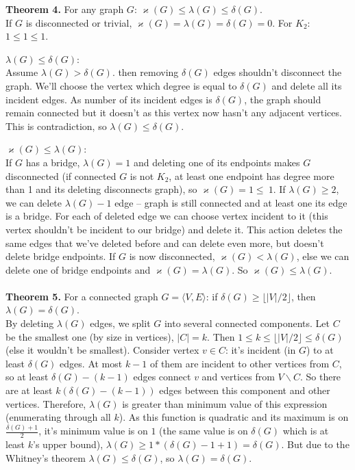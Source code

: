 \documentclass{article}
\begin{document}
	\textbf{Theorem 4.} For any graph $G$: $\varkappa(G) \leq \lambda(G) \leq \delta(G)$.\\
	If $G$ is disconnected or trivial, $\varkappa(G) = \lambda(G) = \delta(G) = 0$. For $K_2$: $1 \leq 1 \leq 1$. \par
	$\lambda(G) \leq \delta(G)$:\\
	Assume $\lambda(G) > \delta(G)$. then removing $\delta(G)$ edges shouldn't disconnect the graph. We'll choose the vertex which degree is equal to $\delta(G)$ and delete all its incident edges. As number of its incident edges is $\delta(G)$, the graph should remain connected but it doesn't as this vertex now hasn't any adjacent vertices. This is contradiction, so $\lambda(G) \leq \delta(G)$.\par 
	$\varkappa(G) \leq \lambda(G)$:\\
	If $G$ has a bridge, $\lambda(G) = 1$ and deleting one of its endpoints makes $G$ disconnected (if connected $G$ is not $K_2$, at least one endpoint has degree more than 1 and its deleting disconnects graph), so $\varkappa(G) = 1 \leq\ 1$. If $\lambda(G) \geq 2$, we can delete $\lambda(G) - 1$ edge -- graph is still connected and at least one its edge is a bridge. For each of deleted edge we can choose vertex incident to it (this vertex shouldn't be incident to our bridge) and delete it. This action deletes the same edges that we've deleted before and can delete even more, but doesn't delete bridge endpoints. If $G$ is now disconnected, $\varkappa(G) < \lambda(G)$, else we can delete one of bridge endpoints and $\varkappa(G) = \lambda(G)$. So $\varkappa(G) \leq \lambda(G)$.\\\\
	\textbf{Theorem 5.} For a connected graph $G = \langle V, E\rangle$: if $\delta(G) \geq\lfloor|V|/2\rfloor$, then $\lambda(G) = \delta(G)$.\\
	By deleting $\lambda(G)$ edges, we split $G$ into several connected components. Let $C$ be the smallest one (by size in vertices), $|C| = k$. Then $1 \leq k \leq \lfloor |V|/2 \rfloor \leq \delta(G)$ (else it wouldn't be smallest). Consider vertex $v \in C$: it's incident (in $G$) to at least $\delta(G)$ edges. At most $k - 1$ of them are incident to other vertices from $C$, so at least $\delta(G) - (k - 1)$ edges connect $v$ and vertices from $V \backslash C$. So there are at least $k(\delta(G) - (k - 1))$ edges between this component and other vertices. Therefore, $\lambda(G)$ is greater than minimum value of this expression (enumerating through all $k$). As this function is quadratic and its maximum is on $\frac{\delta(G) + 1}{2}$, it's minimum value is on $1$ (the same value is on $\delta(G)$ which is at least $k$'s upper bound), $\lambda(G) \geq 1 * (\delta(G) - 1 + 1) = \delta(G)$. But due to the Whitney's theorem $\lambda(G) \leq \delta(G)$, so $\lambda(G) = \delta(G)$.\newpage
\end{document}
